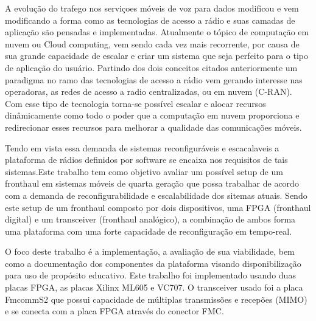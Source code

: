 \documentclass{ufpatcc}
\begin{document}
\begin{ufpaResumo}

A evolu\c{c}\~{a}o do trafego nos servi\c{c}oes m\'{o}veis de voz para dados
modificou e vem modificando a forma como as tecnologias de acesso a r\'{a}dio e
suas camadas de aplica\c{c}\~{a}o s\~{a}o pensadas e implementadas. Atualmente o
t\'{o}pico de computa\c{c}\~{a}o em nuvem ou Cloud computing, vem sendo cada vez
mais recorrente, por causa de sua grande capacidade de escalar e criar um
sistema que seja perfeito para o tipo de aplica\c{c}\~{a}o do usu\'{a}rio.
Partindo dos dois conceitos citados anteriormente um paradigma no ramo das
tecnologias de acesso a r\'{a}dio vem gerando interesse nas operadoras, as redes
de acesso a radio centralizadas, ou em nuvem (C-RAN). Com esse tipo de
tecnologia torna-se poss\'{i}vel escalar e alocar recursos din\^{a}micamente como
todo o poder que a computa\c{c}\~{a}o em nuvem proporciona e redirecionar esses
recursos para melhorar a qualidade das comunica\c{c}\~{o}es m\'{o}veis.

Tendo em vista essa  demanda de sistemas reconfigur\'{a}veis e escacalaveis a
plataforma de r\'{a}dios definidos por software se encaixa nos requisitos de
tais sistemas.Este trabalho tem como objetivo avaliar um poss\'{i}vel setup de
um fronthaul em sistemas m\'{o}veis de quarta gera\c{c}\~{a}o que possa
trabalhar de acordo com a demanda de reconfigurabilidade e escalabilidade dos
sitemas atuais. Sendo este setup de um fronthaul composto por dois dispositivos,
uma FPGA (fronthaul digital) e um transceiver (fronthaul anal\'{o}gico), a
combina\c{c}\~{a}o de ambos forma uma plataforma com uma forte capacidade de
reconfigura\c{c}\~{a}o em tempo-real.


O foco deste trabalho \'{e} a implementa\c{c}\~{a}o, a avalia\c{c}\~{a}o de sua
viabilidade, bem como a documenta\c{c}\~{a}o dos componentes da plataforma
visando disponibiliza\c{c}\~{a}o para uso de prop\'{o}sito educativo. Este
trabalho foi implementado usando duas placas FPGA, as placas Xilinx ML605 e
VC707. O transceiver usado foi a placa FmcommS2 que possui capacidade de
m\'{u}ltiplas transmiss\~{o}es e recep\~{o}es (MIMO) e se conecta com a placa FPGA
atrav\'{e}s do conector FMC.


\end{ufpaResumo}
\end{document}
